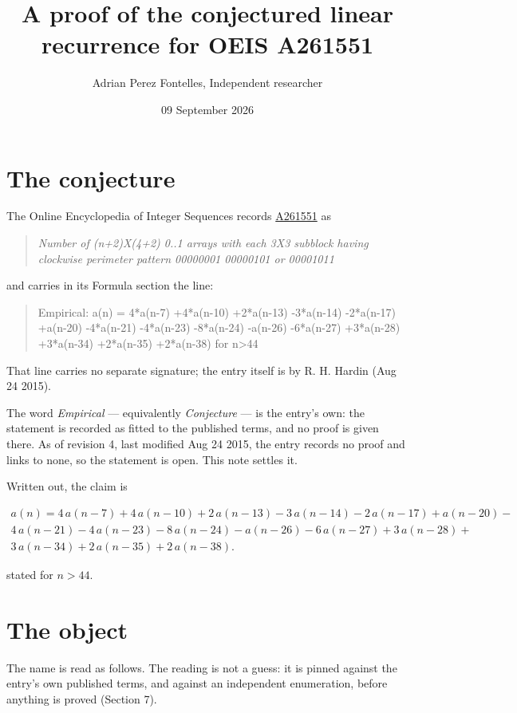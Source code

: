 \documentclass[11pt]{article}
\title{A proof of the conjectured linear recurrence for OEIS A261551}
\author{Adrian Perez Fontelles, Independent researcher}
\date{09 September 2026}
\theoremstyle{definition}
\begin{document}
\maketitle
\section{The conjecture}

The Online Encyclopedia of Integer Sequences records \href{https://oeis.org/A261551}{A261551} as

\begin{quote}\itshape Number of (n+2)X(4+2) 0..1 arrays with each 3X3 subblock having clockwise perimeter pattern 00000001 00000101 or 00001011\end{quote}

and carries in its Formula section the line:

\begin{quote}\ttfamily Empirical: a(n) = 4*a(n-7) +4*a(n-10) +2*a(n-13) -3*a(n-14) -2*a(n-17) +a(n-20) -4*a(n-21) -4*a(n-23) -8*a(n-24) -a(n-26) -6*a(n-27) +3*a(n-28) +3*a(n-34) +2*a(n-35) +2*a(n-38) for n>44\end{quote}

That line carries no separate signature; the entry itself is by R. H. Hardin (Aug 24 2015).

The word {\itshape Empirical} --- equivalently {\itshape Conjecture} --- is the entry's own: the statement is recorded as fitted to the published terms, and no proof is given there. As of revision 4, last modified Aug 24 2015, the entry records no proof and links to none, so the statement is open. This note settles it.

Written out, the claim is

\begin{multline*} a(n) = 4\,a(n-7) + 4\,a(n-10) + 2\,a(n-13) - 3\,a(n-14) - 2\,a(n-17) + a(n-20) - \\ 4\,a(n-21) - 4\,a(n-23) - 8\,a(n-24) - a(n-26) - 6\,a(n-27) + 3\,a(n-28) + \\ 3\,a(n-34) + 2\,a(n-35) + 2\,a(n-38). \end{multline*}

stated for $n > 44$.

\section{The object}

The name is read as follows. The reading is not a guess: it is pinned against the entry's own published terms, and against an independent enumeration, before anything is proved (Section 7).
\end{document}
